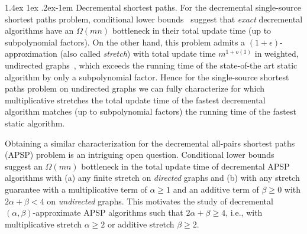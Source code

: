 \documentclass[11pt]{article}
\makeatletter
\theoremstyle{definition}
\theoremstyle{remark}
\renewcommand{\paragraph}{%
  \@startsection{paragraph}{4}%
  {\z@}{1.4ex \@plus 1ex \@minus .2ex}{-1em}%
  {\normalfont\normalsize\bfseries}%
}
\makeatother
\begin{document}
\paragraph{Decremental shortest paths.} For the decremental single-source shortest paths problem, conditional lower bounds~\cite{RodittyZ11,HenzingerKNS15} suggest that \emph{exact} decremental algorithms have an $\Omega(mn)$ bottleneck in their total update time (up to subpolynomial factors).
On the other hand, this problem admits a $ (1 + \epsilon) $-approximation (also called \emph{stretch}) with total update time $ m^{1 + o(1)} $ in weighted, undirected graphs~\cite{BR11,henzinger2014decremental,BernsteinC16,Bernstein17,BernsteinGS21}, which exceeds the running time of the state-of-the art static algorithm by only a subpolynomial factor. Hence for the single-source shortest paths problem on undirected graphs we can fully characterize for which multiplicative stretches the total update time of the fastest decremental algorithm matches (up to subpolynomial factors) the running time of the fastest static algorithm.

Obtaining a similar characterization for the decremental all-pairs shortest paths (APSP) problem is an intriguing open question.
Conditional lower bounds~\cite{DHZ00,HenzingerKNS15} suggest an $\Omega(mn)$ bottleneck in the total update time of decremental APSP algorithms with (a) any finite stretch on \textit{directed} graphs and (b)  with any stretch guarantee with a multiplicative term of $ \alpha \geq 1 $ and an additive term of $ \beta \geq 0 $ with $ 2 \alpha + \beta < 4 $ on \textit{undirected} graphs. This motivates the study of decremental $ (\alpha, \beta) $-approximate APSP algorithms such that $ 2 \alpha + \beta \geq 4 $, i.e., with multiplicative stretch $ \alpha \geq 2 $ or additive stretch $ \beta \geq 2 $.
\end{document}
